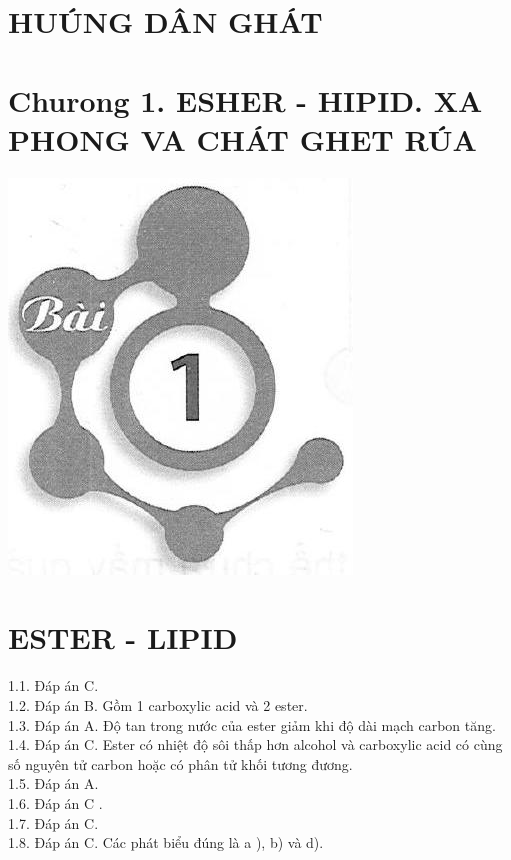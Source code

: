 \documentclass[10pt]{article}
\begin{document}
\captionsetup{singlelinecheck=false}
\section*{HUÚNG DÂN GHÁT}
\section*{Churong 1. ESHER - HIPID. XA PHONG VA CHÁT GHET RÚA}
\begin{center}
\includegraphics[max width=\textwidth]{2025_10_23_b4e16b74380d0f7e7700g-001}
\end{center}

\section*{ESTER - LIPID}
1.1. Đáp án C.\\
1.2. Đáp án B. Gồm 1 carboxylic acid và 2 ester.\\
1.3. Đáp án A. Độ tan trong nước của ester giảm khi độ dài mạch carbon tăng.\\
1.4. Đáp án C. Ester có nhiệt độ sôi thấp hơn alcohol và carboxylic acid có cùng số nguyên tử carbon hoặc có phân tử khối tương đương.\\
1.5. Đáp án A.\\
1.6. Đáp án C .\\
1.7. Đáp án C.\\
1.8. Đáp án C. Các phát biểu đúng là a ), b) và d).
\end{document}
